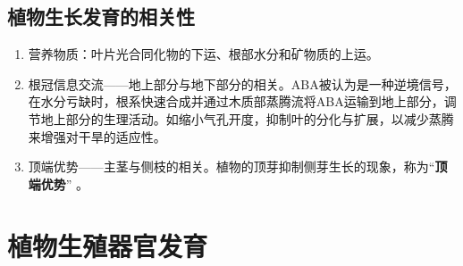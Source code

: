 \subsection{植物生长发育的相关性}
\begin{enumerate}
    \item 营养物质：叶片光合同化物的下运、根部水分和矿物质的上运。
    \item 根冠信息交流——地上部分与地下部分的相关。ABA被认为是一种逆境信号，在水分亏缺时，根系快速合成并通过木质部蒸腾流将ABA运输到地上部分，调节地上部分的生理活动。如缩小气孔开度，抑制叶的分化与扩展，以减少蒸腾来增强对干旱的适应性。
    \item 顶端优势——主茎与侧枝的相关。植物的顶芽抑制侧芽生长的现象，称为“\textbf{顶端优势}” 。 
\end{enumerate}

\section{植物生殖器官发育}
